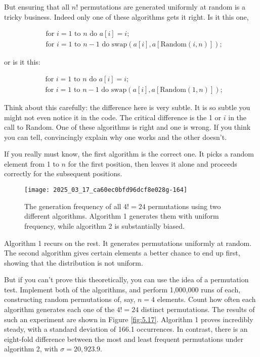 \documentclass[10pt]{article}
\begin{document}
But ensuring that all $n!$ permutations are generated uniformly at random is a tricky business. Indeed only one of these algorithms gets it right. Is it this one,

\[
\begin{aligned}
&\text{for } i=1 \text{ to } n \text{ do } a[i]=i; \\
&\text{for } i=1 \text{ to } n-1 \text{ do } \text{swap}(a[i], a[\text{Random}(i, n)]);
\end{aligned}
\]

or is it this:

\[
\begin{aligned}
&\text{for } i=1 \text{ to } n \text{ do } a[i]=i; \\
&\text{for } i=1 \text{ to } n-1 \text{ do } \text{swap}(a[i], a[\text{Random}(1, n)]);
\end{aligned}
\]

Think about this carefully: the difference here is very subtle. It is so subtle you might not even notice it in the code. The critical difference is the 1 or $i$ in the call to Random. One of these algorithms is right and one is wrong. If you think you can tell, convincingly explain why one works and the other doesn’t.

If you really must know, the first algorithm is the correct one. It picks a random element from 1 to $n$ for the first position, then leaves it alone and proceeds correctly for the subsequent positions.

\pagebreak
\begin{figure}[H]
    \centering
    \texttt{[image: 2025\_03\_17\_ca60ec0bfd96dcf8e028g-164]}
    \caption{The generation frequency of all $4!=24$ permutations using two different algorithms. Algorithm 1 generates them with uniform frequency, while algorithm 2 is substantially biased.}
\end{figure}

Algorithm 1 recurs on the rest. It generates permutations uniformly at random. The second algorithm gives certain elements a better chance to end up first, showing that the distribution is not uniform.

But if you can't prove this theoretically, you can use the idea of a permutation test. Implement both of the algorithms, and perform 1,000,000 runs of each, constructing random permutations of, say, $n = 4$ elements. Count how often each algorithm generates each one of the $4!=24$ distinct permutations. The results of such an experiment are shown in Figure \ref{fig:5.17}. Algorithm 1 proves incredibly steady, with a standard deviation of 166.1 occurrences. In contrast, there is an eight-fold difference between the most and least frequent permutations under algorithm 2, with $\sigma=20,923.9$.
\end{document}
